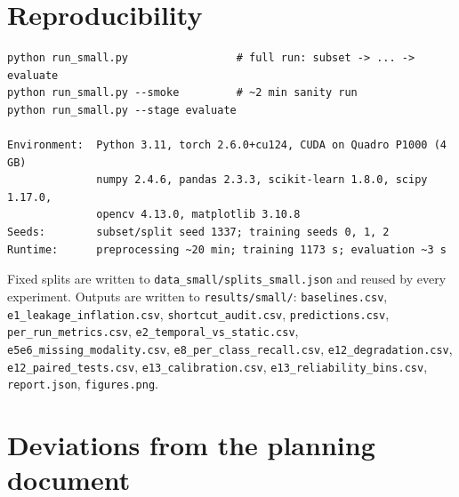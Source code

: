 \documentclass[11pt,a4paper]{article}
\newcommand{\code}[1]{\texttt{\small #1}}
\begin{document}
\section{Reproducibility}

\begin{Verbatim}[fontsize=\small,frame=single,framesep=3mm]
python run_small.py                 # full run: subset -> ... -> evaluate
python run_small.py --smoke         # ~2 min sanity run
python run_small.py --stage evaluate

Environment:  Python 3.11, torch 2.6.0+cu124, CUDA on Quadro P1000 (4 GB)
              numpy 2.4.6, pandas 2.3.3, scikit-learn 1.8.0, scipy 1.17.0,
              opencv 4.13.0, matplotlib 3.10.8
Seeds:        subset/split seed 1337; training seeds 0, 1, 2
Runtime:      preprocessing ~20 min; training 1173 s; evaluation ~3 s
\end{Verbatim}

\noindent
Fixed splits are written to \code{data\_small/splits\_small.json} and reused by every
experiment. Outputs are written to \code{results/small/}: \code{baselines.csv},
\code{e1\_leakage\_inflation.csv}, \code{shortcut\_audit.csv}, \code{predictions.csv},
\code{per\_run\_metrics.csv}, \code{e2\_temporal\_vs\_static.csv},
\code{e5e6\_missing\_modality.csv}, \code{e8\_per\_class\_recall.csv},
\code{e12\_degradation.csv}, \code{e12\_paired\_tests.csv}, \code{e13\_calibration.csv},
\code{e13\_reliability\_bins.csv}, \code{report.json}, \code{figures.png}.

\section{Deviations from the planning document}
\end{document}
